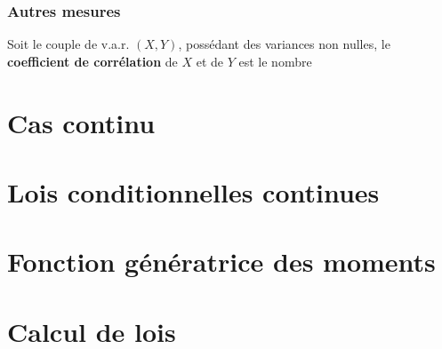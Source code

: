 \documentclass[10pt, french]{report}
\begin{document}
\begin{multicols*}{2}
\subsubsection{Autres mesures}
\begin{definitionNOHFILL}
Soit le couple de v.a.r. $(X, Y)$, possédant des variances non nulles, le \textbf{coefficient de corrélation} de $X$ et de $Y$ est le nombre 
\end{definitionNOHFILL}



\columnbreak
\section{Cas continu}


\columnbreak
\section{Lois conditionnelles continues}


\columnbreak
\section{Fonction génératrice des moments}


\columnbreak
\section{Calcul de lois}




\end{multicols*}
\end{document}
